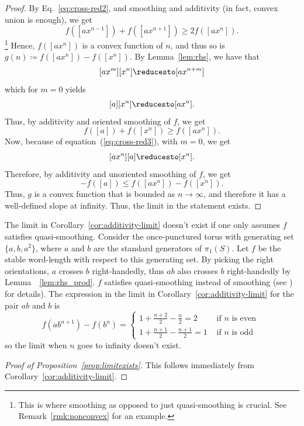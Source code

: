 \begin{proof}
  By Eq.~\eqref{eq:cross-red2}, and smoothing and additivity (in fact, convex union is enough), we get
  \[
  f([ax^{n-1}]) + f([ax^{n+1}]) \geq 2 f([ax^n]).
  \]
  \footnote{This is where smoothing as opposed to just
    quasi-smoothing is crucial. See Remark~\ref{rmk:nonconvex} for an example.}
  Hence, $f([a x^n])$ is a convex function
  of $n$, and thus so is $g(n) \coloneqq f([a x^n]) - f([x^n])$.
 By Lemma~\ref{lem:rhs}, we have that
 \[
 [ax^m][x^n] \reducesto [ax^{n+m}]
 \]
 which for $m=0$ yields
 \[
 [a][x^n] \reducesto [ax^{n}].
 \] 
 Thus, by additivity and oriented smoothing of $f$, we get
 \[
 f([a]) + f([x^n]) \geq f([ax^{n}]).
 \]
 Now, because of equation~(\ref{eq:cross-red3}),
 with $m=0$, we get
 \[
 [ax^n][a] \reducesto [x^{n}].
 \]  
 Therefore, by additivity and unoriented smoothing of $f$, we get
  \[
    -f([a]) \le f([a x^n]) - f([x^n]).
  \]
  Thus, $g$ is a convex function that is bounded as $n \to \infty$, and therefore it has a
  well-defined slope at infinity. Thus, the limit in the statement exists.
\end{proof}

\begin{remark}
\label{rmk:nonconvex}
The limit in Corollary~\ref{cor:additivity-limit} doesn't exist if one only assumes $f$ satisfies quasi-smoothing.
Consider the once-punctured torus with generating set $\{a,b,a^2\}$, where $a$ and $b$ are the standard generators of $\pi_1(S)$.
Let $f$ be the stable word-length with respect to this generating set.
By picking the right orientations, $a$ crosses $b$ right-handedly, thus $ab$ also crosses $b$ right-handedly by Lemma~~\ref{lem:rhs_prod}.
$f$ satisfies quasi-smoothing instead of smoothing (see \cite[Example~4.10]{MGT19:CurvesToCurrents}) for details). 
The expression in the limit in Corollary~\ref{cor:additivity-limit} for the pair $ab$ and $b$ is
\begin{equation*}
f(ab^{n+1})-f(b^n)=\left\{ \begin{array}{cc} 1+ \frac{n+2}{2} - \frac{n}{2}=2& \mbox{ if } n \mbox{ is even } \\ 1+ \frac{n+1}{2} - \frac{n+1}{2}=1 & \mbox{ if } n \mbox{ is odd } \end{array} \right.
\end{equation*}
so the limit when $n$ goes to infinity doesn't exist.
\end{remark}

\begin{proof}[Proof of Proposition~\ref{prop:limitexists}]
This follows immediately from Corollary~\ref{cor:additivity-limit}.
\end{proof}

